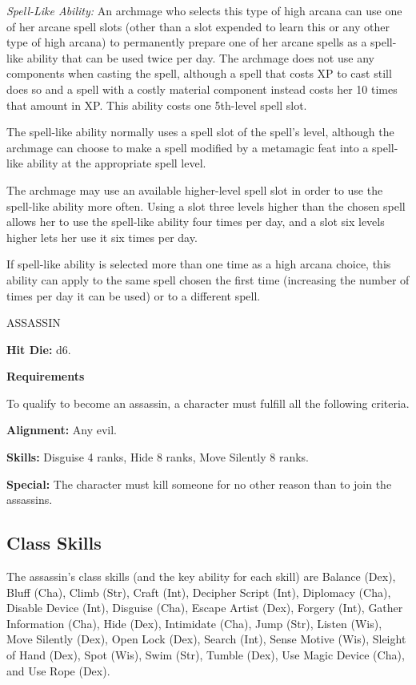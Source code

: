 \documentclass{article}
\begin{document}
\textit{Spell-Like Ability: }An archmage who selects this type of high arcana can 
use one of her arcane spell slots (other than a slot expended to learn this or 
any other type of high arcana) to permanently prepare one of her arcane spells 
as a spell-like ability that can be used twice per day. The archmage does not use 
any components when casting the spell, although a spell that costs XP to cast still 
does so and a spell with a costly material component instead costs her 10 times 
that amount in XP. This ability costs one 5th-level spell slot. 

The spell-like ability normally uses a spell slot of the spell's level, although 
the archmage can choose to make a spell modified by a metamagic feat into a spell-like 
ability at the appropriate spell level. 

The archmage may use an available higher-level spell slot in order to use the spell-like 
ability more often. Using a slot three levels higher than the chosen spell allows 
her to use the spell-like ability four times per day, and a slot six levels higher 
lets her use it six times per day. 

If spell-like ability is selected more than one time as a high arcana choice, this 
ability can apply to the same spell chosen the first time (increasing the number 
of times per day it can be used) or to a different spell.

\vspace{12pt}
ASSASSIN

\textbf{Hit Die:} d6.

\textbf{Requirements}

To qualify to become an assassin, a character must fulfill all the following criteria.

\textbf{Alignment:} Any evil.

\textbf{Skills:} Disguise 4 ranks, Hide 8 ranks, Move Silently 8 ranks.

\textbf{Special:} The character must kill someone for no other reason than to join 
the assassins.

\vspace{12pt}
\subsection*{\textbf{Class Skills}}

The assassin's class skills (and the key ability for each skill) are Balance (Dex), 
Bluff (Cha), Climb (Str), Craft (Int), Decipher Script (Int), Diplomacy (Cha), 
Disable Device (Int), Disguise (Cha), Escape Artist (Dex), Forgery (Int), Gather 
Information (Cha), Hide (Dex), Intimidate (Cha), Jump (Str), Listen (Wis), Move 
Silently (Dex), Open Lock (Dex), Search (Int), Sense Motive (Wis), Sleight of Hand 
(Dex), Spot (Wis), Swim (Str), Tumble (Dex), Use Magic Device (Cha), and Use Rope 
(Dex).  
\end{document}
